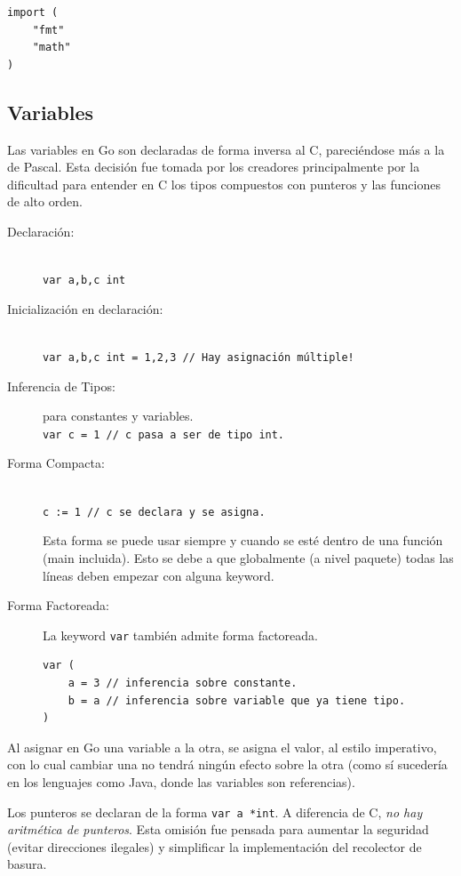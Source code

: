 \documentclass{article}
\begin{document}
\begin{lstlisting}[caption=Forma Factoreada]
import (
	"fmt" 
	"math"
)
\end{lstlisting}

\subsection{Variables}
Las variables en Go son declaradas de forma inversa al C, pareciéndose más a la de Pascal. Esta decisión fue tomada por los creadores principalmente por la dificultad para entender en C los tipos compuestos con punteros y las funciones de alto orden\cite{dec}.
\begin{description}
	\item[Declaración:]\hfill \\
		\lstinline|var a,b,c int|
	\item[Inicialización en declaración:] \hfill \\
		\lstinline|var a,b,c int = 1,2,3 // Hay asignación múltiple!|
	\item[Inferencia de Tipos:] para constantes y variables. \\
		\lstinline|var c = 1 // c pasa a ser de tipo int.|
	\item[Forma Compacta:] \hfill \\
		\lstinline|c := 1 // c se declara y se asigna.|
	
	Esta forma se puede usar siempre y cuando se esté dentro de una función (main incluida). Esto se debe a que globalmente (a nivel paquete) todas las líneas deben empezar con alguna keyword. 
	\item[Forma Factoreada:] La keyword \lstinline|var| también admite forma factoreada.
\begin{lstlisting}
var (
	a = 3 // inferencia sobre constante.
	b = a // inferencia sobre variable que ya tiene tipo.
)
\end{lstlisting}
\end{description}

Al asignar en Go una variable a la otra, se asigna el valor, al estilo imperativo, con lo cual cambiar una no tendrá ningún efecto sobre la otra (como sí sucedería en los lenguajes como Java, donde las variables son referencias).

Los punteros se declaran de la forma \lstinline|var a *int|. A diferencia de C, \emph{no hay aritmética de punteros}. Esta omisión fue pensada para aumentar la seguridad (evitar direcciones ilegales) y simplificar la implementación del recolector de basura.\cite{pa}
\end{document}
